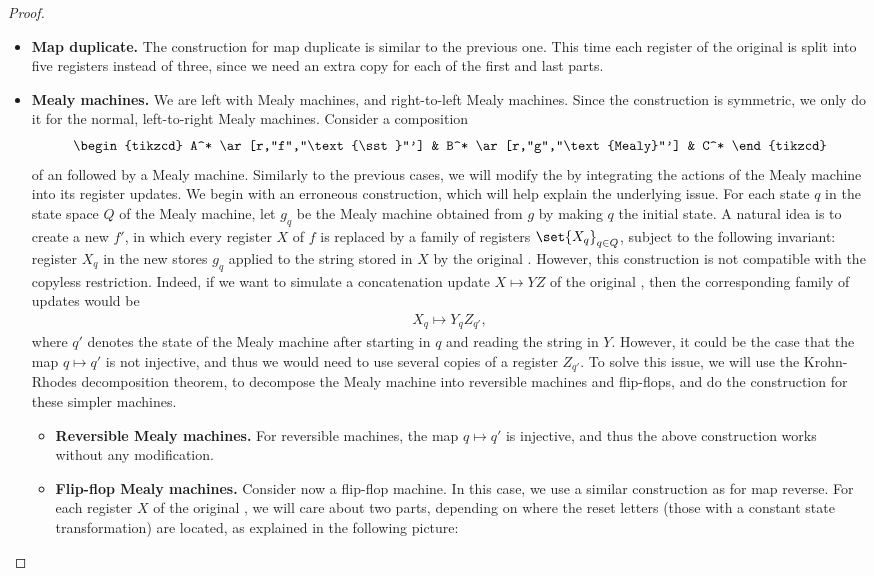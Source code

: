 \begin{proof}
\begin{itemize}
 \item \textbf{Map duplicate.} The construction for map duplicate is similar to the previous one. This time each register of the original \sst is split into five registers instead of three, since we need an extra copy for each of the first and last parts.
 \item \textbf{Mealy machines.} We are left with Mealy machines, and right-to-left Mealy machines. Since the construction is symmetric, we only do it for the normal, left-to-right Mealy machines. Consider a composition 
\[
\begin{tikzcd}
A^* 
\ar[r,"f","\text{\sst}"']
&
B^*
\ar[r,"g","\text{Mealy}"']
&
C^*
\end{tikzcd}
\]
of an \sst followed by a Mealy machine. Similarly to the previous cases, we will modify the \sst by integrating the actions of the Mealy machine into its register updates. We begin with an erroneous construction, which will help explain the underlying issue. For each state $q$ in the state space $Q$ of the Mealy machine, let $g_q$ be the Mealy machine obtained from $g$ by making $q$ the initial state. A natural idea is to create a new \sst $f'$, in which every register $X$ of $f$ is replaced by a family of registers $\set{X_q}_{q \in Q}$, subject to the following invariant: register $X_q$ in the new \sst stores $g_q$ applied to the string stored in $X$ by the original \sst. However, this construction is not compatible with the copyless restriction. Indeed, if we want to simulate a concatenation update $X \mapsto  YZ$ of the original \sst, then the corresponding family of updates would be 
\begin{align*}
 X_q \mapsto  Y_q Z_{q'},
\end{align*}
where $q'$ denotes the state of the Mealy machine after starting in $q$ and reading the string in $Y$. However, it could be the case that the map $q \mapsto q'$ is not injective, and thus we would need to use several copies of a register $Z_{q'}$. To solve this issue, we will use the Krohn-Rhodes decomposition theorem, to decompose the Mealy machine into reversible machines and flip-flops, and do the construction for these simpler machines. 
\begin{itemize}
    \item \textbf{Reversible Mealy machines.} For reversible machines, the map $q \mapsto q'$ is injective, and thus the above construction works without any modification.
    \item \textbf{Flip-flop Mealy machines.} Consider now a flip-flop machine. In this case, we use a similar construction as for map reverse. For each register $X$ of the original \sst, we will care about two parts, depending on where the reset letters (those with a constant state transformation) are located, as explained in the following picture:

\end{itemize}
\end{itemize}
\end{proof}
